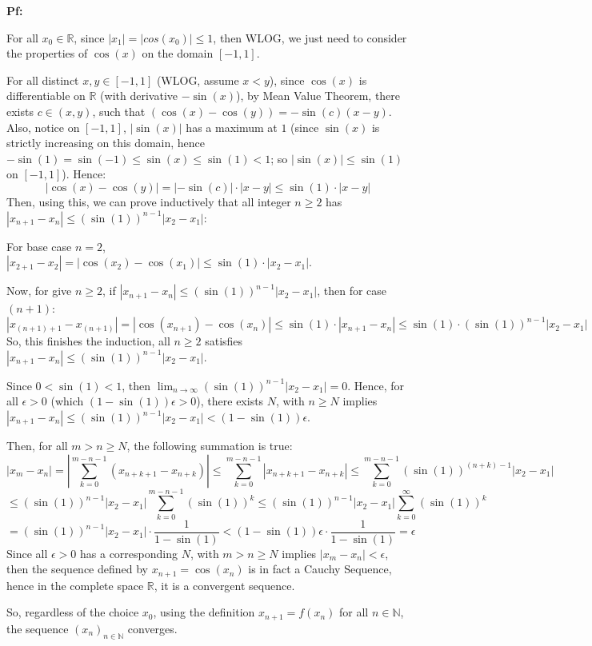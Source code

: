 \documentclass{article}
\begin{document}
\textbf{Pf:}

For all $x_0\in\mathbb{R}$, since $|x_1|=|cos(x_0)|\leq 1$, then WLOG, we just need to consider the properties of $\cos(x)$ on the domain $[-1,1]$.

For all distinct $x,y\in[-1,1]$ (WLOG, assume $x<y$), since $\cos(x)$ is differentiable on $\mathbb{R}$ (with derivative $-\sin(x)$), by Mean Value Theorem, 
there exists $c\in (x,y)$, such that $(\cos(x)-\cos(y))=-\sin(c)(x-y)$. Also, notice on $[-1,1]$, $|\sin(x)|$ has a maximum at $1$ 
(since $\sin(x)$ is strictly increasing on this domain, hence $-\sin(1)=\sin(-1)\leq \sin(x)\leq \sin(1) < 1$; so $|\sin(x)|\leq \sin(1)$ on $[-1,1]$). Hence:
$$|\cos(x)-\cos(y)|=|-\sin(c)|\cdot|x-y| \leq \sin(1)\cdot|x-y|$$
Then, using this, we can prove inductively that all integer $n\geq 2$ has $|x_{n+1}-x_n| \leq (\sin(1))^{n-1}|x_2-x_1|$:

For base case $n=2$, $|x_{2+1}-x_2| = |\cos(x_2)-\cos(x_1)| \leq \sin(1)\cdot |x_2-x_1|$.

Now, for give $n\geq 2$, if $|x_{n+1}-x_n|\leq (\sin(1))^{n-1}|x_2-x_1|$, then for case $(n+1)$:
$$|x_{(n+1)+1}-x_{(n+1)}|=|\cos(x_{n+1})-\cos(x_n)|\leq \sin(1)\cdot|x_{n+1}-x_n|\leq \sin(1)\cdot (\sin(1))^{n-1}|x_2-x_1|$$
So, this finishes the induction, all $n\geq 2$ satisfies $|x_{n+1}-x_n|\leq (\sin(1))^{n-1}|x_2-x_1|$.

Since $0<\sin(1)<1$, then $\lim_{n\rightarrow\infty}(\sin(1))^{n-1}|x_2-x_1|=0$. Hence, for all $\epsilon>0$ (which $(1-\sin(1))\epsilon>0$), there exists $N$, with $n\geq N$ implies $|x_{n+1}-x_n|\leq (\sin(1))^{n-1}|x_2-x_1|<(1-\sin(1))\epsilon$.

Then, for all $m>n\geq N$, the following summation is true:
$$|x_m-x_n| = \left|\sum_{k=0}^{m-n-1}(x_{n+k+1}-x_{n+k})\right|\leq\sum_{k=0}^{m-n-1}|x_{n+k+1}-x_{n+k}| \leq \sum_{k=0}^{m-n-1}(\sin(1))^{(n+k)-1}|x_2-x_1|$$
$$\leq (\sin(1))^{n-1}|x_2-x_1|\sum_{k=0}^{m-n-1}(\sin(1))^k\leq (\sin(1))^{n-1}|x_2-x_1|\sum_{k=0}^{\infty}(\sin(1))^k $$
$$= (\sin(1))^{n-1}|x_2-x_1|\cdot\frac{1}{1-\sin(1)} < (1-\sin(1))\epsilon\cdot\frac{1}{1-\sin(1)}=\epsilon$$
Since all $\epsilon>0$ has a corresponding $N$, with $m>n\geq N$ implies $|x_m-x_n|<\epsilon$, then the sequence defined by $x_{n+1}=\cos(x_n)$ is in fact a Cauchy Sequence,
hence in the complete space $\mathbb{R}$, it is a convergent sequence.

So, regardless of the choice $x_0$, using the definition $x_{n+1}=f(x_n)$ for all $n\in\mathbb{N}$, the sequence $(x_n)_{n\in\mathbb{N}}$ converges.
\end{document}
